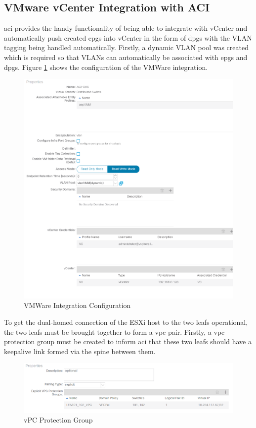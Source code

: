 \subsection{VMware vCenter Integration with ACI}
\gls{aci} provides the handy functionality of being able to integrate with
vCenter and automatically push created \gls{epg}s into vCenter in the form of
\gls{dpg}s with the VLAN tagging being handled automatically.
Firstly, a dynamic VLAN pool was created which is required so that VLANs can
automatically be associated with \gls{epg}s and \gls{dpg}s. Figure
\ref{fig:vmm-integration} shows the configuration of the VMWare integration.

\begin{figure}[H]
    
    \centering
    \includegraphics[scale=0.6]{images/vmm-integration.png}
    
    \caption{VMWare Integration Configuration}
    \label{fig:vmm-integration}
\end{figure}

To get the dual-homed connection of the ESXi host to the two leafs operational,
the two leafs must be brought together to form a \gls{vpc} pair.
Firstly, a \gls{vpc} protection group must be created to inform \gls{aci} that
these two leafs should have a keepalive link formed via the spine between them.
\begin{figure}[H]
    
    \centering
    \includegraphics[scale=0.7]{images/vpc-protection.png}
    
    \caption{vPC Protection Group}
    \label{fig:vpc-protection}
\end{figure}

